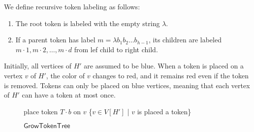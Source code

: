 \documentclass[runningheads]{llncs}
\theoremstyle{plain}
\theoremstyle{definition}
\begin{document}
We define recursive token labeling as follows:
\begin{enumerate}
    \item The root token is labeled with the empty string $\lambda$.
    \item If a parent token has label $m=\lambda b_1 b_2 \dots b_{h-1}$, its children are labeled $m \cdot 1, m \cdot 2, \dots, m \cdot d$ from lef child to right child.
\end{enumerate}

Initially, all vertices of $H'$ are assumed to be blue. When a token is placed on a vertex $v$ of $H'$, the color of $v$ changes to red, and it remains red even if the token is removed. Tokens can only be placed on blue vertices, meaning that each vertex of $H'$ can have a token at most once.


\begin{comment}
\ifthenelse{\boolean{Draft}}{
\begin{figure}[t]
    \centering
    \texttt{[image: pic10.eps]}
    \caption{given $H$ with $d=2, l=2$ (left) and $t=1$, the construction of $H'$ (center) and $M_{t, d, l}$ (right). $H'$ is obtained by adding a complete directed $d$-ary tree (red part) connected to each root of $H$. Moreover, the labeling of $M_{t, d, l}$ is constructed recursively by appending one character to the right of the parent's label.}
    \label{fig:10}
\end{figure}
}
\end{comment}



\begin{figure}[!t]
\begin{algorithm}[H]
	\caption{$\mathsf{GrowTokenTree}$}
	\label{growtokentree}
	\begin{algorithmic}[1]
    \STATE place token $T \cdot b$ on $v$
    \ENDWHILE
    \RETURN \{$v \in V[H']$ | $v$ is placed a token\}
	\end{algorithmic}
\end{algorithm}
\end{figure}
\end{document}
